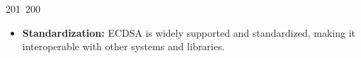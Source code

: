 201~200~\documentclass{article}
\begin{document}
\begin{itemize}
	                                                                                                                                                                                                                                                                                                	                                                                                                                                        	    	                                                                                                	                                                                                                                                                                                                                                                                                                                                	                                                                        	                                                                        	                                                                                                                                        	                                                                                                                                                                                                                        	                                                                                    \item \textbf{Standardization:} ECDSA is widely supported and standardized, making it interoperable with other systems and libraries.
	                                                                                                                                                                                                                                                                                                	                                                                                                                                        	    	                                                                                                	                                                                                                                                                                                                                                                                                                                                	                                                                        	                                                                        	                                                                                                                                        	                                                                                                                                                                                                                        	                                                                                    \end{itemize}
\end{document}
